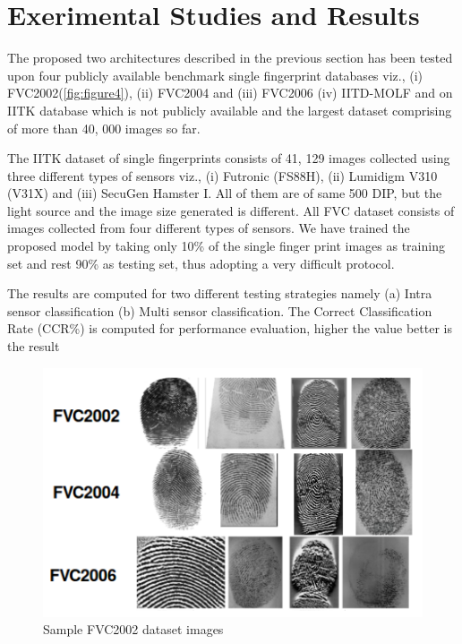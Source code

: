 \chapter{Exerimental Studies and Results}
\label{chapter4}

	The proposed two architectures described in the previous section has been tested upon four publicly available benchmark single fingerprint databases viz., (i) FVC2002(\ref{fig:figure4}), (ii) FVC2004 and (iii) FVC2006 (iv) IITD-MOLF and on IITK database which is not publicly available and the largest dataset comprising of more than 40, 000 images so far.
	
	The IITK dataset of single fingerprints consists of 41, 129 images collected using three different types of sensors viz., (i) Futronic (FS88H), (ii) Lumidigm V310 (V31X) and (iii) SecuGen Hamster I. All of them are of same 500 DIP, but the light source and the image size generated is different. All FVC dataset consists of images collected from four different types of sensors. We have trained the proposed model by taking only 10\% of the single finger print images as training set and rest 90\% as testing set, thus adopting a very difficult protocol.
	
	The results are computed for two different testing strategies namely (a) Intra sensor classification (b) Multi sensor classification. The Correct Classification Rate (CCR\%) is computed for performance evaluation, higher the value better is the result

\begin{figure}[htbp]
\centering
\includegraphics[scale=1]{./Chapter4/Figures/fvcsampleImages}
\caption{Sample FVC2002 dataset images}
\label{fig:figure5}
\end{figure}

